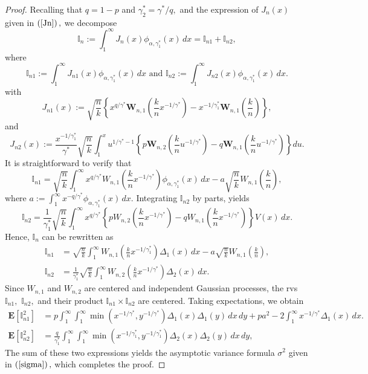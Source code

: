 \documentclass[reqno,openbib,runningheads,a4paper,12pt]{amsart}%
\begin{document}
\begin{proof}
Recalling that $q=1-p$ and $\gamma_{2}^{\ast}=\gamma^{\ast}/q,$ and the
expression of $J_{n}(x)$ given in $\left(  \ref{Jn}\right)  ,$ we decompose
\[
\mathbb{I}_{n}:=\int_{1}^{\infty}J_{n}(x)\phi_{\alpha,\gamma_{1}^{\ast}%
}(x)\,dx=\mathbb{I}_{n1}+\mathbb{I}_{n2},
\]
where
\[
\mathbb{I}_{n1}:=\int_{1}^{\infty}J_{n1}(x)\phi_{\alpha,\gamma_{1}^{\ast}%
}(x)\,dx\text{ and }\mathbb{I}_{n2}:=\int_{1}^{\infty}J_{n2}(x)\phi
_{\alpha,\gamma_{1}^{\ast}}(x)\,dx.
\]
with%
\[
J_{n1}\left(  x\right)  :=\sqrt{\frac{n}{k}}\left\{  x^{q/\gamma^{\ast}%
}\mathbf{W}_{n,1}\left(  \frac{k}{n}x^{-1/\gamma^{\ast}}\right)
-x^{-1/\gamma_{1}^{\ast}}\mathbf{W}_{n,1}\left(  \frac{k}{n}\right)  \right\}
,
\]
and
\[
J_{n2}\left(  x\right)  :=\dfrac{x^{-1/\gamma_{1}^{\ast}}}{\gamma^{\ast}}%
\sqrt{\dfrac{n}{k}}%
{\displaystyle\int_{1}^{x}}
u^{1/\gamma^{\ast}-1}\left\{  p\mathbf{W}_{n,2}\left(  \dfrac{k}%
{n}u^{-1/\gamma^{\ast}}\right)  -q\mathbf{W}_{n,1}\left(  \dfrac{k}%
{n}u^{-1/\gamma^{\ast}}\right)  \right\}  du.
\]
It is straightforward to verify that
\[
\mathbb{I}_{n1}=\sqrt{\frac{n}{k}}\int_{1}^{\infty}x^{q/\gamma^{\ast}}%
W_{n,1}\left(  \frac{k}{n}x^{-1/\gamma^{\ast}}\right)  \phi_{\alpha,\gamma
_{1}^{\ast}}(x)\,dx-a\sqrt{\frac{n}{k}}W_{n,1}\left(  \frac{k}{n}\right)  ,
\]
where $a:=\int_{1}^{\infty}x^{-q/\gamma^{\ast}}\phi_{\alpha,\gamma_{1}^{\ast}%
}(x)\,dx.$ Integrating $\mathbb{I}_{n2}$ by parts, yields
\[
\mathbb{I}_{n2}=\frac{1}{\gamma_{1}^{\ast}}\sqrt{\frac{n}{k}}\int_{1}^{\infty
}x^{q/\gamma^{\ast}}\left\{  pW_{n,2}\left(  \frac{k}{n}x^{-1/\gamma^{\ast}%
}\right)  -qW_{n,1}\left(  \frac{k}{n}x^{-1/\gamma^{\ast}}\right)  \right\}
V(x)\,dx.
\]
Hence, $\mathbb{I}_{n}$ can be rewritten as%
\begin{align*}
\mathbb{I}_{n1} &  =\sqrt{\frac{n}{k}}\int_{1}^{\infty}W_{n,1}\left(  \frac
{k}{n}x^{-1/\gamma_{1}^{\ast}}\right)  \Delta_{1}(x)\,dx-a\sqrt{\frac{n}{k}%
}W_{n,1}\left(  \frac{k}{n}\right)  ,\\
\mathbb{I}_{n2} &  =\frac{1}{\gamma_{1}^{\ast}}\sqrt{\frac{n}{k}}\int%
_{1}^{\infty}W_{n,2}\left(  \frac{k}{n}x^{-1/\gamma^{\ast}}\right)  \Delta
_{2}(x)\,dx.
\end{align*}
Since $W_{n,1}$ and $W_{n,2}$ are centered and independent Gaussian processes,
the rvs $\mathbb{I}_{n1},$ $\mathbb{I}_{n2},$ and their product $\mathbb{I}%
_{n1}\times\mathbb{I}_{n2}$ are centered. Taking expectations, we obtain
\begin{align*}
\mathbf{E}[\mathbb{I}_{n1}^{2}] &  =p\int_{1}^{\infty}\int_{1}^{\infty}%
\min(x^{-1/\gamma^{\ast}},y^{-1/\gamma^{\ast}})\Delta_{1}(x)\Delta
_{1}(y)\,dx\,dy+pa^{2}-2\int_{1}^{\infty}x^{-1/\gamma^{\ast}}\Delta
_{1}(x)\,dx.\\
\mathbf{E}[\mathbb{I}_{n2}^{2}] &  =\frac{q}{\gamma_{1}^{\ast}}\int%
_{1}^{\infty}\int_{1}^{\infty}\min(x^{-1/\gamma_{1}^{\ast}},y^{-1/\gamma
_{1}^{\ast}})\Delta_{2}(x)\Delta_{2}(y)\,dx\,dy,
\end{align*}
The sum of these two expressions yields the asymptotic variance formula
$\sigma^{2}$ given in $\left(  \ref{sigma}\right)  ,$ which completes the proof.
\end{proof}
\end{document}
